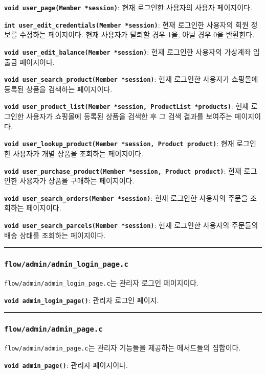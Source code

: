 \documentclass[runningheads]{llncs}
\begin{document}
\textbf{\texttt{void user_page(Member *session)}}: 현재 로그인한 사용자의 사용자 페이지이다.

\textbf{\texttt{int user_edit_credentials(Member *session)}}: 현재 로그인한 사용자의 회원 정보를 수정하는 페이지이다. 현재 사용자가 탈퇴할 경우 1을, 아닐 경우 0을 반환한다.

\textbf{\texttt{void user_edit_balance(Member *session)}}: 현재 로그인한 사용자의 가상계좌 입출금 페이지이다.

\textbf{\texttt{void user_search_product(Member *session)}}: 현재 로그인한 사용자가 쇼핑몰에 등록된 상품을 검색하는 페이지이다.

\textbf{\texttt{void user_product_list(Member *session, ProductList *products)}}: 현재 로그인한 사용자가 쇼핑몰에 등록된 상품을 검색한 후 그 검색 결과를 보여주는 페이지이다.

\textbf{\texttt{void user_lookup_product(Member *session, Product product)}}: 현재 로그인한 사용자가 개별 상품을 조회하는 페이지이다.

\textbf{\texttt{void user_purchase_product(Member *session, Product product)}}: 현재 로그인한 사용자가 상품을 구매하는 페이지이다.

\textbf{\texttt{void user_search_orders(Member *session)}}: 현재 로그인한 사용자의 주문을 조회하는 페이지이다.

\textbf{\texttt{void user_search_parcels(Member *session)}}: 현재 로그인한 사용자의 주문들의 배송 상태를 조회하는 페이지이다.

\noindent\rule{2cm}{0.4pt}

\subsubsection{\texttt{flow/admin/admin_login_page.c}}
\texttt{flow/admin/admin_login_page.c}는 관리자 로그인 페이지이다.

\textbf{\texttt{void admin_login_page()}}: 관리자 로그인 페이지.

\noindent\rule{2cm}{0.4pt}

\subsubsection{\texttt{flow/admin/admin_page.c}}
\texttt{flow/admin/admin_page.c}는 관리자 기능들을 제공하는 메서드들의 집합이다.

\textbf{\texttt{void admin_page()}}: 관리자 페이지이다.
\end{document}
